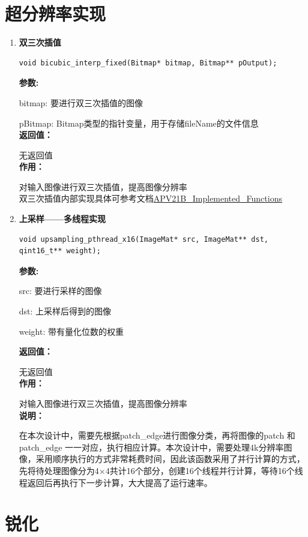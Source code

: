 \documentclass[12pt, a4paper, oneside]{ctexbook}
\begin{document}
	\section{超分辨率实现}
	\begin{enumerate}
		\item \textbf{双三次插值}
		\begin{lstlisting}[numbers=none]
void bicubic_interp_fixed(Bitmap* bitmap, Bitmap** pOutput);
		\end{lstlisting}
		\textbf{参数:} \par bitmap: 要进行双三次插值的图像 \par pBitmap: Bitmap类型的指针变量，用于存储fileName的文件信息 \\
		\textbf{返回值：}\par 无返回值\\
		\textbf{作用：}\par 对输入图像进行双三次插值，提高图像分辨率\\
		双三次插值内部实现具体可参考文档\href{.ref/APV21B_Implemented_Functions.pdf}{APV21B_Implemented_Functions}
	
	\item \textbf{上采样——多线程实现}
		\begin{lstlisting}[numbers=none]
void upsampling_pthread_x16(ImageMat* src, ImageMat** dst, qint16_t** weight);			
		\end{lstlisting}
		\textbf{参数:} \par src: 要进行采样的图像 \par dst: 上采样后得到的图像\par weight: 带有量化位数的权重\par
		\textbf{返回值：}\par 无返回值\\
		\textbf{作用：}\par 对输入图像进行双三次插值，提高图像分辨率\\
		\textbf{说明：}\par 在本次设计中，需要先根据patch\_edge进行图像分类，再将图像的patch 和 patch\_edge 一一对应，执行相应计算。本次设计中，需要处理4k分辨率图像，采用顺序执行的方式非常耗费时间，因此该函数采用了并行计算的方式，先将待处理图像分为4×4共计16个部分，创建16个线程并行计算，等待16个线程返回后再执行下一步计算，大大提高了运行速率。

		
	\end{enumerate}
	

		
	\section{锐化}
\end{document}
